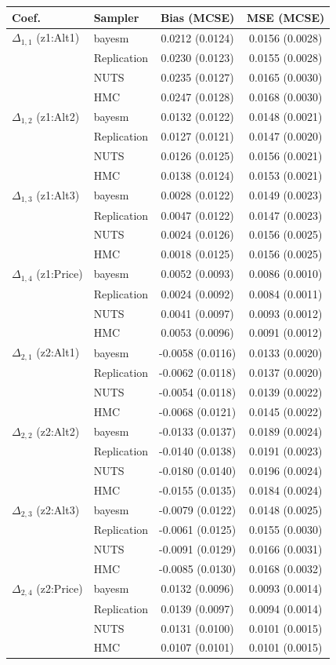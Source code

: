 \begin{tabular}{llcc}
\toprule
Coef. & Sampler & Bias (MCSE) & MSE (MCSE) \\
\midrule
$\Delta_{1,1}$ (z1:Alt1) & bayesm & 0.0212 (0.0124) & 0.0156 (0.0028) \\
 & Replication & 0.0230 (0.0123) & 0.0155 (0.0028) \\
 & NUTS & 0.0235 (0.0127) & 0.0165 (0.0030) \\
 & HMC & 0.0247 (0.0128) & 0.0168 (0.0030) \\
$\Delta_{1,2}$ (z1:Alt2) & bayesm & 0.0132 (0.0122) & 0.0148 (0.0021) \\
 & Replication & 0.0127 (0.0121) & 0.0147 (0.0020) \\
 & NUTS & 0.0126 (0.0125) & 0.0156 (0.0021) \\
 & HMC & 0.0138 (0.0124) & 0.0153 (0.0021) \\
$\Delta_{1,3}$ (z1:Alt3) & bayesm & 0.0028 (0.0122) & 0.0149 (0.0023) \\
 & Replication & 0.0047 (0.0122) & 0.0147 (0.0023) \\
 & NUTS & 0.0024 (0.0126) & 0.0156 (0.0025) \\
 & HMC & 0.0018 (0.0125) & 0.0156 (0.0025) \\
$\Delta_{1,4}$ (z1:Price) & bayesm & 0.0052 (0.0093) & 0.0086 (0.0010) \\
 & Replication & 0.0024 (0.0092) & 0.0084 (0.0011) \\
 & NUTS & 0.0041 (0.0097) & 0.0093 (0.0012) \\
 & HMC & 0.0053 (0.0096) & 0.0091 (0.0012) \\
$\Delta_{2,1}$ (z2:Alt1) & bayesm & -0.0058 (0.0116) & 0.0133 (0.0020) \\
 & Replication & -0.0062 (0.0118) & 0.0137 (0.0020) \\
 & NUTS & -0.0054 (0.0118) & 0.0139 (0.0022) \\
 & HMC & -0.0068 (0.0121) & 0.0145 (0.0022) \\
$\Delta_{2,2}$ (z2:Alt2) & bayesm & -0.0133 (0.0137) & 0.0189 (0.0024) \\
 & Replication & -0.0140 (0.0138) & 0.0191 (0.0023) \\
 & NUTS & -0.0180 (0.0140) & 0.0196 (0.0024) \\
 & HMC & -0.0155 (0.0135) & 0.0184 (0.0024) \\
$\Delta_{2,3}$ (z2:Alt3) & bayesm & -0.0079 (0.0122) & 0.0148 (0.0025) \\
 & Replication & -0.0061 (0.0125) & 0.0155 (0.0030) \\
 & NUTS & -0.0091 (0.0129) & 0.0166 (0.0031) \\
 & HMC & -0.0085 (0.0130) & 0.0168 (0.0032) \\
$\Delta_{2,4}$ (z2:Price) & bayesm & 0.0132 (0.0096) & 0.0093 (0.0014) \\
 & Replication & 0.0139 (0.0097) & 0.0094 (0.0014) \\
 & NUTS & 0.0131 (0.0100) & 0.0101 (0.0015) \\
 & HMC & 0.0107 (0.0101) & 0.0101 (0.0015) \\
\bottomrule
\end{tabular}
